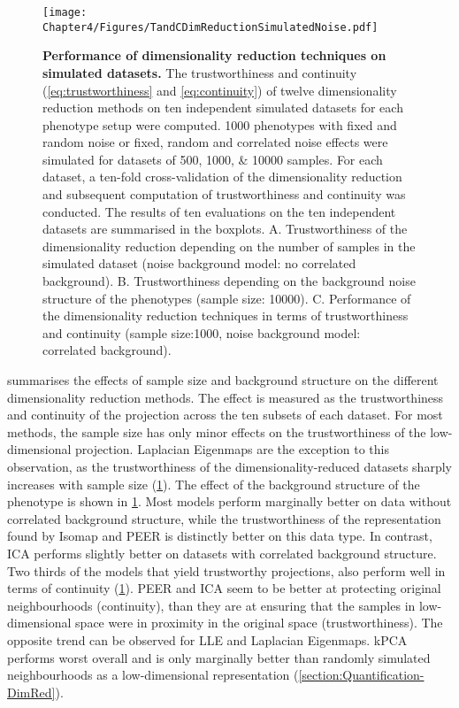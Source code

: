 \begin{figure}[hbtp]
	\centering
	\texttt{[image: Chapter4/Figures/TandCDimReductionSimulatedNoise.pdf]}
	\caption[\textbf{Performance of dimensionality reduction techniques on simulated datasets.}]{\textbf{Performance of dimensionality reduction techniques on simulated datasets.} The trustworthiness and continuity (\cref{eq:trustworthiness} and \cref{eq:continuity}) of twelve dimensionality reduction methods on ten independent simulated datasets for each phenotype setup were computed.  \num{1000} phenotypes with fixed and random noise or fixed, random and correlated noise effects were simulated for datasets of \numlist{500;1000; 10000} samples. For each dataset, a ten-fold cross-validation of the dimensionality reduction and subsequent computation of trustworthiness and continuity was conducted. The results of ten evaluations on the ten independent datasets are summarised in the boxplots. A. Trustworthiness of the dimensionality reduction depending on the number of samples in the simulated dataset (noise background model: no correlated background). B. Trustworthiness depending on the background noise structure of the phenotypes (sample size: \num{10000}). C. Performance of the dimensionality reduction techniques in terms of trustworthiness and continuity (sample size:\num{1000}, noise background model: correlated background).}
	 	\label{fig:TaC-noise}
\end{figure}


 summarises the effects of sample size and background structure on the different dimensionality reduction methods. The effect is measured as the trustworthiness and continuity of the projection across the ten subsets of each dataset. For most methods, the sample size has only minor effects on the trustworthiness of the low-dimensional projection. Laplacian Eigenmaps are the exception to this observation, as the trustworthiness of the dimensionality-reduced datasets sharply increases with sample size (\cref{fig:TaC-noise}). The effect of the background structure of the phenotype is shown in \cref{fig:TaC-noise}. Most models perform marginally better on data without correlated background structure, while the trustworthiness of the representation found by Isomap and PEER is distinctly better on this data type. In contrast, ICA performs slightly better on datasets with correlated background structure. Two thirds of the models that yield trustworthy projections, also perform well in terms of continuity (\cref{fig:TaC-noise}). PEER and ICA seem to be better at protecting original neighbourhoods (continuity), than they are at ensuring that the samples in low-dimensional space were in proximity in the original space (trustworthiness). The opposite trend can be observed for LLE and Laplacian Eigenmaps. kPCA performs worst overall and is only marginally better than randomly simulated neighbourhoods as a low-dimensional representation (\cref{section:Quantification-DimRed}).


